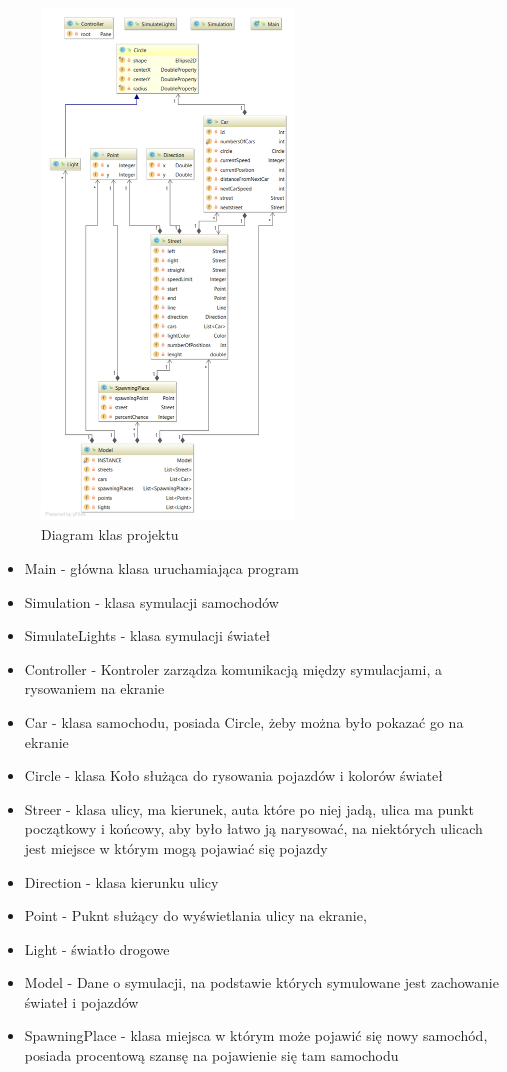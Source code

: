 \documentclass{sprawozdanie-agh}
\begin{document}
	\begin{figure}[H]
		\centering
		\captionsetup{justification=centering}
		\includegraphics[width=0.6\textwidth]{uml}
		\caption{Diagram klas projektu}
		\label{fig:klasy}
	\end{figure}

	\begin{itemize}
		\item Main - główna klasa uruchamiająca program
		\item Simulation - klasa symulacji samochodów
		\item SimulateLights - klasa symulacji świateł
		\item Controller - Kontroler zarządza komunikacją między symulacjami, a rysowaniem na ekranie
		\item Car - klasa samochodu, posiada Circle, żeby można było pokazać go na ekranie
		\item Circle - klasa Koło służąca do rysowania pojazdów i kolorów świateł
		\item Streer - klasa ulicy, ma kierunek, auta które po niej jadą, ulica ma punkt początkowy i końcowy, aby było łatwo ją narysować, na niektórych ulicach jest miejsce w którym mogą pojawiać się pojazdy
		\item Direction - klasa kierunku ulicy
		\item Point - Puknt służący do wyświetlania ulicy na ekranie,
		\item Light - światło drogowe
		\item Model - Dane o symulacji, na podstawie których symulowane jest zachowanie świateł i pojazdów
		\item SpawningPlace - klasa miejsca w którym może pojawić się nowy samochód, posiada procentową szansę na pojawienie się tam samochodu
	\end{itemize}
\end{document}
